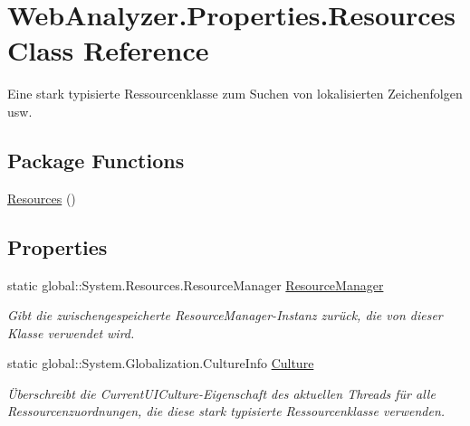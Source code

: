 \hypertarget{class_web_analyzer_1_1_properties_1_1_resources}{}\section{Web\+Analyzer.\+Properties.\+Resources Class Reference}
\label{class_web_analyzer_1_1_properties_1_1_resources}


Eine stark typisierte Ressourcenklasse zum Suchen von lokalisierten Zeichenfolgen usw.  


\subsection*{Package Functions}
\begin{DoxyCompactItemize}
\item 
\hyperlink{class_web_analyzer_1_1_properties_1_1_resources_a6658b63f15a132d8463727b4a9b57a1c}{Resources} ()
\end{DoxyCompactItemize}
\subsection*{Properties}
\begin{DoxyCompactItemize}
\item 
static global\+::\+System.\+Resources.\+Resource\+Manager \hyperlink{class_web_analyzer_1_1_properties_1_1_resources_a952c3262175975dd9ed444245795013e}{Resource\+Manager}
\begin{DoxyCompactList}\small\item\em Gibt die zwischengespeicherte Resource\+Manager-\/\+Instanz zurück, die von dieser Klasse verwendet wird. \end{DoxyCompactList}\item 
static global\+::\+System.\+Globalization.\+Culture\+Info \hyperlink{class_web_analyzer_1_1_properties_1_1_resources_af4ffabc99956a2a25a06d43705a448ae}{Culture}
\begin{DoxyCompactList}\small\item\em Überschreibt die Current\+U\+I\+Culture-\/\+Eigenschaft des aktuellen Threads für alle Ressourcenzuordnungen, die diese stark typisierte Ressourcenklasse verwenden. \end{DoxyCompactList}\end{DoxyCompactItemize}
